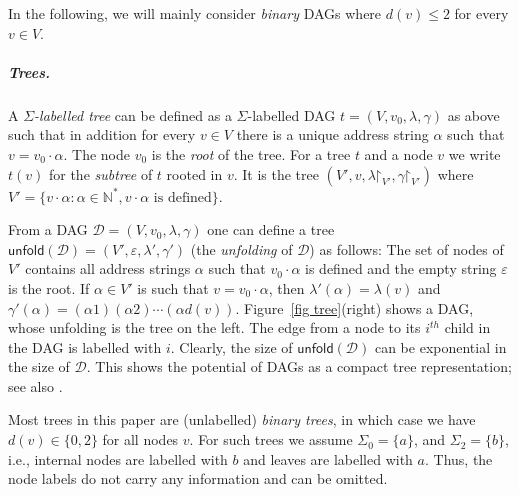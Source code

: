 \documentclass[a4paper,UKenglish,cleveref, autoref, thm-restate, numberwithinsect]{lipics-v2021}
\newcommand{\unfold}{\mathsf{unfold}}
\newcommand{\rest}{\mathord\restriction}
\begin{document}
In the following, we will mainly consider \emph{binary} DAGs where $d(v) \leq 2$ for every $v \in V$.

\subparagraph{Trees.}
A  \emph{$\Sigma$-labelled tree} can be defined as a $\Sigma$-labelled DAG $t = (V, v_0, \lambda, \gamma)$
as above such that in addition for every $v \in V$ there is a unique address string $\alpha$ such that $v = v_0 \cdot \alpha$.
The node $v_0$ is the \emph{root} of the tree.
For a tree $t$ and a node 
$v$ we write $t(v)$ for the \emph{subtree} of $t$ rooted in $v$. It is the tree $(V', v, \lambda\rest_{V'}, \gamma\rest_{V'})$ where
$V' = \{ v \cdot \alpha : \alpha \in \mathbb{N}^*, v \cdot \alpha \text{ is defined}\}$.

From a DAG $\mathcal{D} = (V, v_0, \lambda, \gamma)$ one can define a tree $\unfold(\mathcal{D})= (V', \varepsilon, \lambda', \gamma')$ (the \emph{unfolding} of $\mathcal{D}$) as follows:
The set of nodes of $V'$ contains all address strings $\alpha$ such that $v_0\cdot\alpha$ is defined and the empty
string $\varepsilon$ is the root.
If $\alpha \in V'$ is such that $v = v_0 \cdot \alpha$,
then $\lambda'(\alpha) = \lambda(v)$ and $\gamma'(\alpha) = (\alpha 1) (\alpha 2) \cdots (\alpha d(v))$.
Figure~\ref{fig tree}(right) shows a DAG, whose unfolding is the tree on the left. The edge from a node to its $i^{th}$ 
child in the DAG is labelled with $i$. Clearly, the size of $\unfold(\mathcal{D})$ can be exponential in the size of $\mathcal{D}$.
This shows the potential of DAGs as a compact tree representation; see also \cite{DowneyST80,FlajoletSS90}.

Most trees in this paper are (unlabelled) \emph{binary trees}, in which case we have $d(v) \in \{0,2\}$ for all nodes $v$. 
For such trees we assume $\Sigma_0 = \{a\}$, and $\Sigma_2 = \{b\}$, i.e., internal nodes are labelled with $b$ and leaves are labelled with $a$.
Thus, the node labels do not carry any information and can be omitted.
\end{document}
